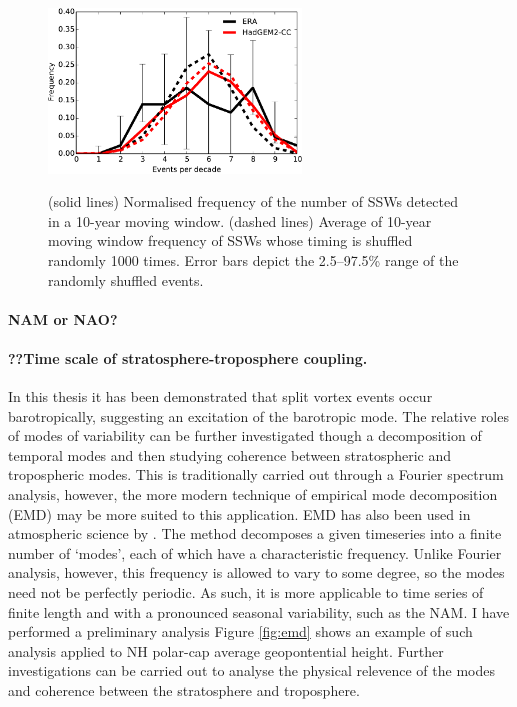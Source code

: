 \begin{figure}[t]
  \centering
  \noindent\includegraphics[width=0.6\textwidth,angle=0]{figures/chapter-conclusions/events_decadal.pdf}\\
  \caption[Decadal variability of SSWs]{(solid lines) Normalised frequency of
    the number of SSWs detected in a 10-year moving window. (dashed lines)
    Average of 10-year moving window frequency of SSWs whose timing is shuffled
    randomly 1000 times. Error bars depict the 2.5--97.5\%
    range of the randomly shuffled events.}\label{fig:decadal}
\end{figure}


\paragraph{NAM or NAO?}


\paragraph{??Time scale of stratosphere-troposphere coupling.} In this thesis it
has been demonstrated that split vortex events occur barotropically, suggesting
an excitation of the barotropic mode. The relative roles of modes of variability
can be further investigated though a decomposition of temporal modes and then
studying coherence between stratospheric and tropospheric modes. This is
traditionally carried out through a Fourier spectrum analysis, however, the more
modern technique of empirical mode decomposition (EMD) \citep{Huang1998} may be
more suited to this application. EMD has also been used in atmospheric science
by \citet{Coughlin2004}. The method decomposes a given timeseries into a finite
number of `modes', each of which have a characteristic frequency. Unlike Fourier
analysis, however, this frequency is allowed to vary to some degree, so the
modes need not be perfectly periodic. As such, it is more applicable to time
series of finite length and with a pronounced seasonal variability, such as the
NAM. I have performed a preliminary analysis Figure \ref{fig:emd} shows an
example of such analysis applied to NH polar-cap average geopontential
height. Further investigations can be carried out to analyse the physical
relevence of the modes and coherence between the stratosphere and troposphere.

